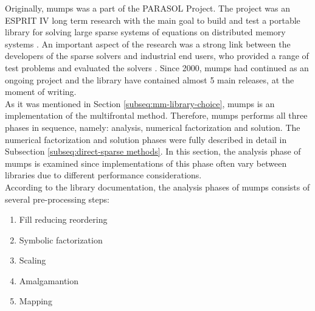 \label{subseq:mumps-review}

Originally, \acrfull{mumps} was a part of the PARASOL Project. The project was an ESPRIT IV long term research with the main goal to build and test a portable library for solving large sparse systems of equations on distributed memory systems \cite{PARASOL}. An important aspect of the research was a strong link between the developers of the sparse solvers and industrial end users, who provided a range of test problems and evaluated the solvers \cite{MUMPS:description}. Since 2000, \acrshort{mumps} had continued as an ongoing project and the library have contained almost 5 main releases, at the moment of writing.\\



As it was mentioned in Section \ref{subseq:mm-library-choice}, \acrshort{mumps} is an implementation of the multifrontal method. Therefore, \acrshort{mumps} performs all three phases in sequence, namely: analysis, numerical factorization and solution. The numerical factorization and solution phases were fully described in detail in Subsection \ref{subseq:direct-sparse methods}. In this section, the analysis phase of \acrshort{mumps} is examined since implementations of this phase often vary between libraries due to different  performance considerations.\\


According to the library documentation, the analysis phases of \acrshort{mumps} consists of several pre-processing steps:

\begin{enumerate}
  \item Fill reducing reordering \label{mumps:analysis-steps:1}
  \item Symbolic factorization \label{mumps:analysis-steps:2}
  \item Scaling \label{mumps:analysis-steps:3}
  \item Amalgamantion \label{mumps:analysis-steps:4}
  \item Mapping \label{mumps:analysis-steps:5}
\end{enumerate}


